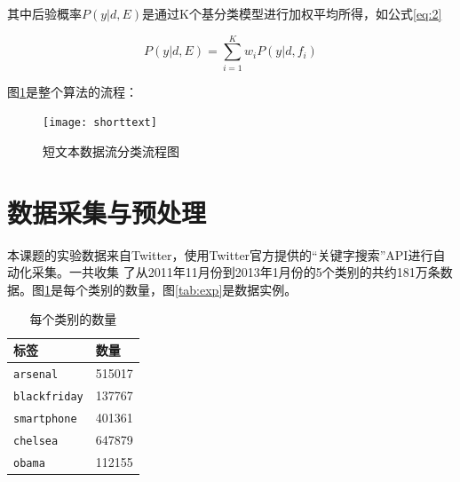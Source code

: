 其中后验概率$P(y|d, E)$是通过K个基分类模型进行加权平均所得，如公式\ref{eq:2}

\begin{equation}
  \label{eq:2}
  P(y|d, E) = \sum_{i=1}^{K}w_iP(y|d, f_i)
\end{equation}



图\ref{fig:shorttextclass}是整个算法的流程：

\begin{figure}[htb]
  \centering
  \texttt{[image: shorttext]}
  \caption{短文本数据流分类流程图}
  \label{fig:shorttextclass}
\end{figure}


\section{数据采集与预处理}
本课题的实验数据来自Twitter，使用Twitter官方提供的“关键字搜索”API进行自动化采集。一共收集
了从2011年11月份到2013年1月份的5个类别的共约181万条数据。图\ref{tab:number}是每个类别的数量，图\ref{tab:exp}是数据实例。

\begin{table}[H]                                                                    \begin{singlespace}                                                          
    \centering\caption{每个类别的数量}\label{tab:number}
    \renewcommand{\arraystretch}{1.5} %
    \begin{tabular}{p{2.5cm}p{2cm}}\hline                                                        标签    
      & 数量 \\ \hline                                                
      \verb|arsenal| & 515017 \\                                                   
      \verb|blackfriday| & 137767 \\
      \verb|smartphone| & 401361 \\
      \verb|chelsea| & 647879 \\
     \verb|obama| & 112155 \\ \hline                                     
    \end{tabular}                                                                                       
  \end{singlespace}
\end{table}

